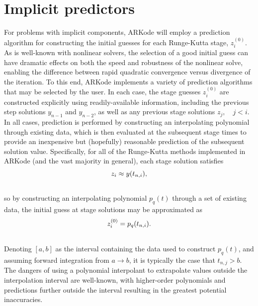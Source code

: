 \documentclass[letterpaper,10pt,english]{sphinxmanual}
\begin{document}
\section{Implicit predictors}
\label{Mathematics:implicit-predictors}\label{Mathematics:mathematics-predictors}
For problems with implicit components, ARKode will employ a prediction
algorithm for constructing the initial guesses for each Runge-Kutta
stage, $z_i^{(0)}$.  As is well-known with nonlinear solvers,
the selection of a good initial guess can have dramatic effects on both
the speed and robustness of the nonlinear solve, enabling the
difference between rapid quadratic convergence versus divergence of
the iteration.  To this end, ARKode implements a variety of prediction
algorithms that may be selected by the user.  In each case, the stage
guesses $z_i^{(0)}$ are constructed explicitly using
readily-available information, including the previous step solutions
$y_{n-1}$ and $y_{n-2}$, as well as any previous stage
solutions $z_j, \quad j<i$.  In all cases, prediction is
performed by constructing an interpolating polynomial through
existing data, which is then evaluated at the subsequent stage times
to provide an inexpensive but (hopefully) reasonable prediction of the
subsequent solution value.  Specifically, for all of the Runge-Kutta
methods implemented in ARKode (and the vast majority in general), each
stage solution satisfies
\begin{gather}
\begin{split}z_i \approx y(t_{n,i}),\end{split}\notag\\\begin{split}\end{split}\notag
\end{gather}
so by constructing an interpolating polynomial $p_q(t)$ through
a set of existing data, the initial guess at stage solutions may be
approximated as
\begin{gather}
\begin{split}z_i^{(0)} = p_q(t_{n,i}).\end{split}\notag\\\begin{split}\end{split}\notag
\end{gather}
Denoting $[a,b]$ as the interval containing the data used to
construct $p_q(t)$, and assuming forward integration from
$a\to b$, it is typically the case that $t_{n,j} > b$.
The dangers of using a polynomial interpolant to extrapolate values
outside the interpolation interval are well-known, with higher-order
polynomials and predictions further outside the interval resulting in
the greatest potential inaccuracies.
\end{document}
